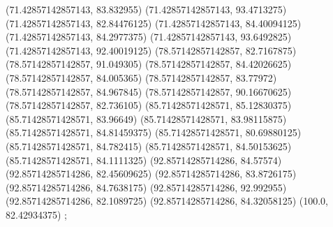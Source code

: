{{{		(71.42857142857143, 83.832955)
		(71.42857142857143, 93.4713275)
		(71.42857142857143, 82.84476125)
		(71.42857142857143, 84.40094125)
		(71.42857142857143, 84.2977375)
		(71.42857142857143, 93.6492825)
		(71.42857142857143, 92.40019125)
		(78.57142857142857, 82.7167875)
		(78.57142857142857, 91.049305)
		(78.57142857142857, 84.42026625)
		(78.57142857142857, 84.005365)
		(78.57142857142857, 83.77972)
		(78.57142857142857, 84.967845)
		(78.57142857142857, 90.16670625)
		(78.57142857142857, 82.736105)
		(85.71428571428571, 85.12830375)
		(85.71428571428571, 83.96649)
		(85.71428571428571, 83.98115875)
		(85.71428571428571, 84.81459375)
		(85.71428571428571, 80.69880125)
		(85.71428571428571, 84.782415)
		(85.71428571428571, 84.50153625)
		(85.71428571428571, 84.1111325)
		(92.85714285714286, 84.57574)
		(92.85714285714286, 82.45609625)
		(92.85714285714286, 83.8726175)
		(92.85714285714286, 84.7638175)
		(92.85714285714286, 92.992955)
		(92.85714285714286, 82.1089725)
		(92.85714285714286, 84.32058125)
		(100.0, 82.42934375)
	};

}}
